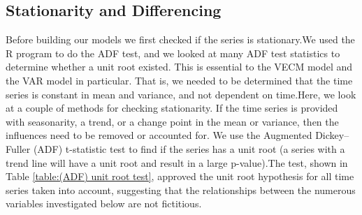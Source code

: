 \subsection{Stationarity and Differencing}
Before building our models we first checked  if the series is stationary.We used the R program to do the ADF test, and we looked at many ADF test statistics to determine whether a unit root existed. This is essential to the VECM model and the VAR model in particular. That is, we needed to be determined that the time series is constant in mean and variance, and not dependent on time.Here, we look at a couple of methods for checking stationarity. If the time series is provided with seasonarity, a trend, or a change point in the mean or variance, then the influences need to be removed or accounted for. We use the Augmented Dickey–Fuller (ADF) t-statistic test to find if the series has a unit root (a series with a trend line will have a unit root and result in a large p-value)\parencite{dickey1979distribution}.The test, shown in Table \ref{table:(ADF) unit root test}, approved the unit root hypothesis for all time series taken into account, suggesting that the relationships between the numerous variables investigated below are not fictitious.
\label{Chapter4} %

